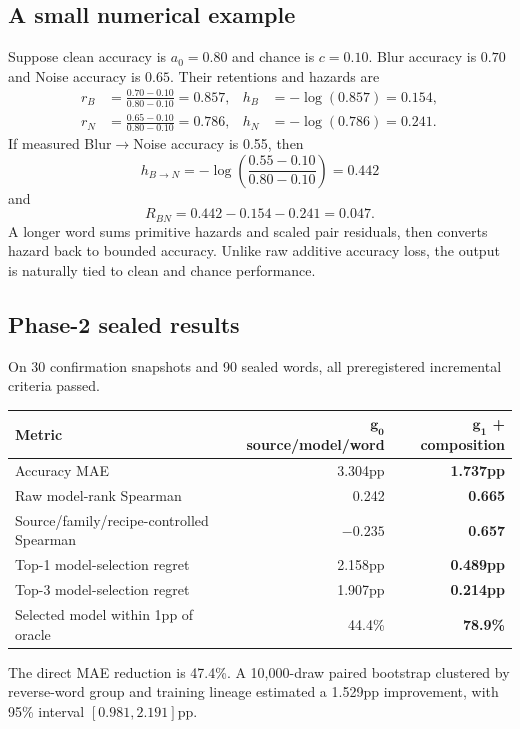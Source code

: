 \documentclass[11pt,a4paper]{article}
\begin{document}
\subsection{A small numerical example}

Suppose clean accuracy is $a_0=0.80$ and chance is $c=0.10$.  Blur accuracy is
$0.70$ and Noise accuracy is $0.65$.  Their retentions and hazards are
\begin{align}
r_B&=\frac{0.70-0.10}{0.80-0.10}=0.857,
&h_B&=-\log(0.857)=0.154,\\
r_N&=\frac{0.65-0.10}{0.80-0.10}=0.786,
&h_N&=-\log(0.786)=0.241.
\end{align}
If measured Blur$\to$Noise accuracy is 0.55, then
\[
h_{B\to N}=-\log\left(\frac{0.55-0.10}{0.80-0.10}\right)=0.442
\]
and
\[
R_{BN}=0.442-0.154-0.241=0.047.
\]
A longer word sums primitive hazards and scaled pair residuals, then converts
hazard back to bounded accuracy.  Unlike raw additive accuracy loss, the output
is naturally tied to clean and chance performance.

\subsection{Phase-2 sealed results}

On 30 confirmation snapshots and 90 sealed words, all preregistered incremental
criteria passed.

\begin{center}
\begin{tabular}{lrr}
\toprule
\textbf{Metric} & $\bm{g_0}$ \textbf{source/model/word} & $\bm{g_1}$ \textbf{+ composition}\\
\midrule
Accuracy MAE & 3.304pp & \textbf{1.737pp}\\
Raw model-rank Spearman & 0.242 & \textbf{0.665}\\
Source/family/recipe-controlled Spearman & $-0.235$ & \textbf{0.657}\\
Top-1 model-selection regret & 2.158pp & \textbf{0.489pp}\\
Top-3 model-selection regret & 1.907pp & \textbf{0.214pp}\\
Selected model within 1pp of oracle & 44.4\% & \textbf{78.9\%}\\
\bottomrule
\end{tabular}
\end{center}

The direct MAE reduction is 47.4\%.  A 10,000-draw paired bootstrap clustered
by reverse-word group and training lineage estimated a 1.529pp improvement,
with 95\% interval $[0.981,2.191]$pp.
\end{document}
